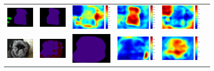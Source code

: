 \begin{figure}
{\begin{tabular}{c c c c c c}
   \includegraphics[height=0.1\linewidth]{fig/voc12/res_baseline/2011_001642.png} &
   \includegraphics[height=0.1\linewidth]{fig/voc12/res_sharenet/2011_001642.png} &
   \includegraphics[height=0.1\linewidth]{fig/voc12/att1/2011_001642.pdf} &
   \includegraphics[height=0.1\linewidth]{fig/voc12/att2/2011_001642.pdf} &
   \includegraphics[height=0.1\linewidth]{fig/voc12/att3/2011_001642.pdf} \\
   \includegraphics[height=0.1\linewidth]{fig/voc12/img/2011_002121.jpg} &
   \includegraphics[height=0.1\linewidth]{fig/voc12/res_baseline/2011_002121.png} &
   \includegraphics[height=0.1\linewidth]{fig/voc12/res_sharenet/2011_002121.png} &
   \includegraphics[height=0.1\linewidth]{fig/voc12/att1/2011_002121.pdf} &
   \includegraphics[height=0.1\linewidth]{fig/voc12/att2/2011_002121.pdf} &

\end{tabular}}
\end{figure}
